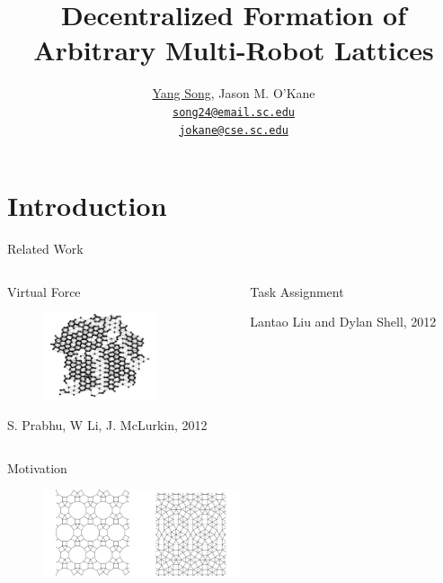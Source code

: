 \documentclass[10pt]{beamer}
\title{Decentralized Formation of Arbitrary Multi-Robot Lattices}
\author{
  \underline{Yang Song}, Jason M. O'Kane\\
  \href{mailto:song24@email.sc.edu}{{\tt song24@email.sc.edu} \\
  \href{mailto:jokane@cse.sc.edu}{\tt jokane@cse.sc.edu}}
}
\institute[
  Dept.\ of Computer Science and Engineering\\
  University of South Carolina
] %
{%
  Dept. of Computer Science and Engineering\\
  University of South Carolina
  
}
\begin{document}
\begin{frame}[plain] %
  \titlepage
\end{frame}

\section{Introduction}
\begin{frame}{Related Work}{}
    \begin{columns}[T] %
      \begin{column}{.45\textwidth}
        \small{Virtual Force}
        \begin{figure}
          \centering
          \includegraphics[height=1in]{figs/james.png}
        \end{figure}
        \footnotesize{S. Prabhu, W Li, J. McLurkin, 2012}
      \end{column}%
      \begin{column}{.45\textwidth}
        \small{Task Assignment}
        \begin{center}
        \end{center}
        \footnotesize{ Lantao Liu and Dylan Shell, 2012}
      \end{column}%
    \end{columns}

\end{frame}


\begin{frame}{Motivation}{}
      
      
  \begin{figure}
    \centering
    \includegraphics[height=1in]{figs/tessellation.png}
  \end{figure}
\end{frame}
\end{document}
